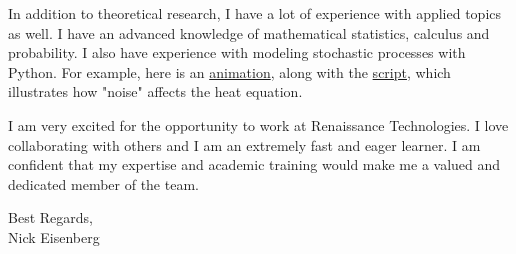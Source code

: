 \documentclass[letterpaper,12pt]{article}
\begin{document}
\vspace{.1in}

In addition to theoretical research, I have a lot of experience with applied topics as well. I have an advanced knowledge of mathematical statistics, calculus and probability. I also have experience with modeling stochastic processes with Python. For example, here is an \href{https://github.com/nickeisenberg/Python/blob/master/Stochastic_Simulations/SHE_FDM/simulation3.gif}{animation}, along with the \href{https://github.com/nickeisenberg/Python/blob/master/Stochastic_Simulations/SHE_FDM/animationSHE.py}{script}, which illustrates how "noise" affects the heat equation. 

\vspace{.1in}
I am very excited for the opportunity to work at Renaissance Technologies. I love collaborating with others and I am an extremely fast and eager learner. I am confident that my expertise and academic training would make me a valued and dedicated member of the team.

\vspace{.2in}
Best Regards, \\
Nick Eisenberg 
\end{document}
